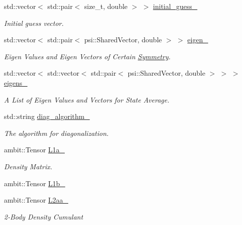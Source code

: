 \begin{DoxyCompactItemize}
std\+::vector$<$ std\+::pair$<$ size\+\_\+t, double $>$ $>$ \mbox{\hyperlink{classforte_1_1_f_c_i___m_o_a0fcb8cf21db93e3cc83ebc9d5e771ff0}{initial\+\_\+guess\+\_\+}}
\begin{DoxyCompactList}\small\item\em Initial guess vector. \end{DoxyCompactList}\item 
std\+::vector$<$ std\+::pair$<$ psi\+::\+Shared\+Vector, double $>$ $>$ \mbox{\hyperlink{classforte_1_1_f_c_i___m_o_af9c2176a824d417e6720c7196900c0c2}{eigen\+\_\+}}
\begin{DoxyCompactList}\small\item\em Eigen Values and Eigen Vectors of Certain \mbox{\hyperlink{classforte_1_1_symmetry}{Symmetry}}. \end{DoxyCompactList}\item 
std\+::vector$<$ std\+::vector$<$ std\+::pair$<$ psi\+::\+Shared\+Vector, double $>$ $>$ $>$ \mbox{\hyperlink{classforte_1_1_f_c_i___m_o_afd2d5fb3aec0ac591b3b32c975703edb}{eigens\+\_\+}}
\begin{DoxyCompactList}\small\item\em A List of Eigen Values and Vectors for State Average. \end{DoxyCompactList}\item 
std\+::string \mbox{\hyperlink{classforte_1_1_f_c_i___m_o_a86350a9c8d2980df43a5f0aa093aaa7b}{diag\+\_\+algorithm\+\_\+}}
\begin{DoxyCompactList}\small\item\em The algorithm for diagonalization. \end{DoxyCompactList}\item 
ambit\+::\+Tensor \mbox{\hyperlink{classforte_1_1_f_c_i___m_o_a3ebb16c04591ae1445318809aa4e717c}{L1a\+\_\+}}
\begin{DoxyCompactList}\small\item\em Density Matrix. \end{DoxyCompactList}\item 
ambit\+::\+Tensor \mbox{\hyperlink{classforte_1_1_f_c_i___m_o_adca77fa1cf357c0fe43d009c69e9b28f}{L1b\+\_\+}}
\item 
ambit\+::\+Tensor \mbox{\hyperlink{classforte_1_1_f_c_i___m_o_a79450c3f2ab285c11108888886e9fcee}{L2aa\+\_\+}}
\begin{DoxyCompactList}\small\item\em 2-\/\+Body Density Cumulant \end{DoxyCompactList}\item 

\end{DoxyCompactItemize}
